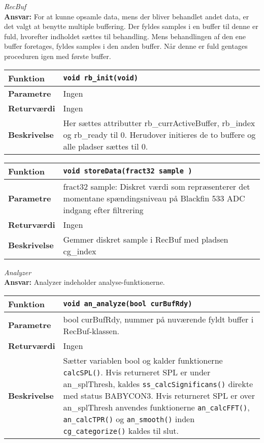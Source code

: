 \textit{RecBuf} \\
\textbf{Ansvar:} For at kunne opsamle data, mens der bliver behandlet andet data, er det valgt at benytte multiple buffering. Der fyldes samples i en buffer til denne er fuld, hvorefter indholdet sættes til behandling. Mens behandlingen af den ene buffer foretages, fyldes samples i den anden buffer. Når denne er fuld gentages proceduren igen med første buffer.

\begin{center}
    \begin{tabular}{ | l | p{} |}
    \hline
    \textbf{Funktion}	& \verb+void rb_init(void) +						\\ \hline
    \textbf{Parametre} 	& Ingen		\\ \hline
    \textbf{Returværdi}	& Ingen 								\\ \hline
    \textbf{Beskrivelse}& Her sættes attributter rb\_currActiveBuffer, rb\_index og rb\_ready til 0. Herudover initieres de to buffere og alle pladser sættes til 0. 		\\ \hline
    \end{tabular}
\end{center} 

\begin{center}
    \begin{tabular}{ | l | p{} |}
    \hline
    \textbf{Funktion}	& \verb+void storeData(fract32 sample ) +						\\ \hline
    \textbf{Parametre} 	& fract32 sample: Diskret værdi som repræsenterer det momentane spændingsniveau på Blackfin 533 ADC indgang efter filtrering	\\ \hline
    \textbf{Returværdi}	& Ingen 								\\ \hline
    \textbf{Beskrivelse}& Gemmer diskret sample i RecBuf med pladsen cg\_index		\\ \hline
    \end{tabular}
\end{center} 



\textit{Analyzer} \\
\textbf{Ansvar:} Analyzer indeholder analyse-funktionerne.

\begin{center}
    \begin{tabular}{ | l | p{} |}
    \hline
    \textbf{Funktion}	& \verb+void an_analyze(bool curBufRdy) +			\\ \hline
    \textbf{Parametre} 	& bool curBufRdy, nummer på nuværende fyldt buffer i RecBuf-klassen.	\\ \hline
    \textbf{Returværdi}	& Ingen 													\\ \hline
    \textbf{Beskrivelse}& Sætter variablen bool og kalder funktionerne \verb+calcSPL()+. Hvis returneret SPL er under an\_splThresh, kaldes \verb+ss_calcSignificans()+ direkte med status BABYCON3. Hvis returneret SPL er over an\_splThresh anvendes funktionerne \verb+an_calcFFT()+, \verb+an_calcTPR()+ og \verb+an_smooth()+ inden \verb+cg_categorize()+ kaldes til slut.	\\ \hline
    \end{tabular}
\end{center} 

